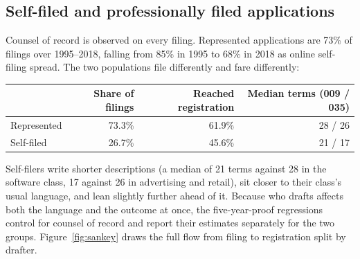 \subsection{Self-filed and professionally filed applications}\label{sec:representation}

Counsel of record is observed on every filing. Represented applications
are 73\% of filings over 1995--2018, falling from 85\% in 1995 to 68\% in
2018 as online self-filing spread. The two populations file differently
and fare differently:

\begin{center}\small
\begin{tabular}{lrrr}
\toprule
 & Share of filings & Reached registration & Median terms (009 / 035) \\
\midrule
Represented & 73.3\% & 61.9\% & 28 / 26 \\
Self-filed  & 26.7\% & 45.6\% & 21 / 17 \\
\bottomrule
\end{tabular}
\end{center}

\noindent Self-filers write shorter descriptions (a median of 21 terms
against 28 in the software class, 17 against 26 in advertising and
retail), sit closer to their class's usual language, and lean slightly
further ahead of it. Because who drafts affects both the language and
the outcome at once, the five-year-proof regressions control for counsel
of record and report their estimates separately for the two groups.
Figure~\ref{fig:sankey} draws the full flow from filing to registration
split by drafter.

